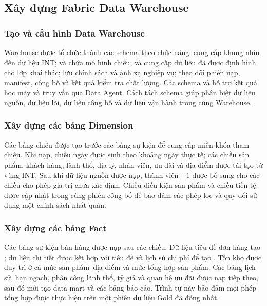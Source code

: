 
\subsection{Xây dựng Fabric Data Warehouse}

\subsubsection{Tạo và cấu hình Data Warehouse}

Warehouse  được tổ chức thành các schema theo chức năng:  cung cấp khung nhìn đến dữ liệu INT;  và  chứa mô hình chiều;  và  cung cấp dữ liệu đã được định hình cho lớp khai thác;  lưu chính sách và ánh xạ nghiệp vụ;  theo dõi phiên nạp, manifest, công bố và kết quả kiểm tra chất lượng. Các schema  và  hỗ trợ kết quả học máy và truy vấn qua Data Agent. Cách tách schema giúp phân biệt dữ liệu nguồn, dữ liệu lõi, dữ liệu công bố và dữ liệu vận hành trong cùng Warehouse.

\subsubsection{Xây dựng các bảng Dimension}

Các bảng chiều được tạo trước các bảng sự kiện để cung cấp miền khóa tham chiếu. Khi nạp, chiều ngày được sinh theo khoảng ngày thực tế; các chiều sản phẩm, khách hàng, lãnh thổ, địa lý, nhân viên, ưu đãi và địa điểm được tái tạo từ vùng INT. Sau khi dữ liệu nguồn được nạp, thành viên $-1$ được bổ sung cho các chiều cho phép giá trị chưa xác định. Chiều điều kiện sản phẩm và chiều tiền tệ được cập nhật trong cùng phiên công bố để bảo đảm các phép lọc và quy đổi sử dụng một chính sách nhất quán.

\subsubsection{Xây dựng các bảng Fact}

Các bảng sự kiện bán hàng được nạp sau các chiều. Dữ liệu tiêu đề đơn hàng tạo ; dữ liệu chi tiết được kết hợp với tiêu đề và lịch sử chi phí để tạo . Tồn kho được duy trì ở cả mức sản phẩm--địa điểm và mức tổng hợp sản phẩm. Các bảng lịch sử, hạn ngạch, phân công lãnh thổ, tỷ giá và quan hệ ưu đãi được nạp tiếp theo, sau đó mới tạo data mart và các bảng báo cáo. Trình tự này bảo đảm mọi phép tổng hợp được thực hiện trên một phiên dữ liệu Gold đã đồng nhất.

